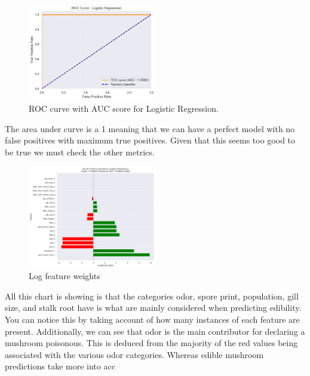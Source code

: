 \documentclass[conference]{IEEEtran}
\begin{document}
\begin{figure}[!htbp]
\centering
\includegraphics[width=0.5\textwidth]{images/logRoc.png}
\caption{ROC curve with AUC score for Logistic Regression.}
\label{fig:log_roc}
\end{figure}
\FloatBarrier

The area under curve is a 1 meaning that we can have a perfect model with no false positives with maximum true positives. Given that this seems too good to be true we must check the other metrics.

\begin{figure}[!htbp]
\centering
\includegraphics[width=0.5\textwidth]{images/logFeatures.png}
\caption{Log feature weights}
\label{fig:log_features}
\end{figure}
\FloatBarrier

All this chart is showing is that the categories odor, spore print, population, gill size, and stalk root have is what are mainly considered when predicting edibility. You can notice this by taking account of how many instances of each feature are present. Additionally, we can see that odor is the main contributor for declaring a mushroom poisonous. This is deduced from the majority of the red values being associated with the various odor categories. Whereas edible mushroom predictions take more into acc
\end{document}
